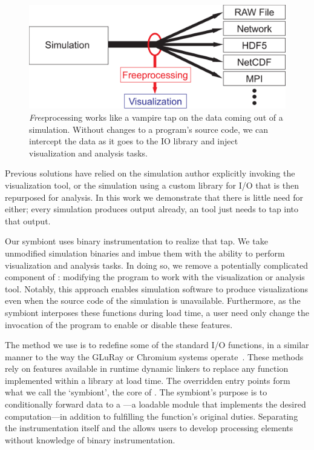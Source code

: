 \begin{figure}
  \centering
  \includegraphics[width=0.95\linewidth]{images/fp/fp}
  \caption{\textit{Free}processing works like a vampire tap on the data
  coming out of a simulation.  Without changes to a program's source
  code, we can intercept the data as it goes to the IO library and
  inject visualization and analysis tasks.}
  \label{fig:interchange}
\end{figure}

Previous \insitu{} solutions have relied on the simulation author
explicitly invoking the visualization tool, or the simulation using a
custom library for I/O that is then repurposed for analysis.  In this
work we demonstrate that there is little need for
either; every simulation produces output already, an \insitu{} tool
just needs to tap into that output.

Our symbiont uses binary instrumentation to realize that tap. We take
unmodified simulation binaries and imbue them with the ability to
perform visualization and analysis tasks.  In doing so, we remove a
potentially
complicated component of \insitu{}: modifying the program to work with
the visualization or analysis tool.  Notably, this approach
enables simulation software to produce \insitu{} visualizations even
when the source code of the simulation is unavailable.  Furthermore, as
the symbiont interposes these functions during load time, a user need
only change the invocation of the program to enable or disable these
features.


The method we use is to redefine some of the standard I/O functions, in
a similar manner to the way the
GLuRay or Chromium systems operate~\cite{Brownlee:2012:GLuRay,
Humphreys:2002:Chromium}.  These methods rely on features available in
runtime dynamic linkers to replace any function implemented within a
library at load time.  The overridden entry points form what we call
the `symbiont', the core of
\freeprocessing{}. The symbiont's purpose is to conditionally forward
data to a
\freeprocessor{}---a loadable module that implements the
desired \insitu{} computation---in addition to fulfilling the
function's original duties.  Separating the instrumentation itself and
the \freeprocessor{} allows users to develop processing elements
without knowledge of binary instrumentation.


